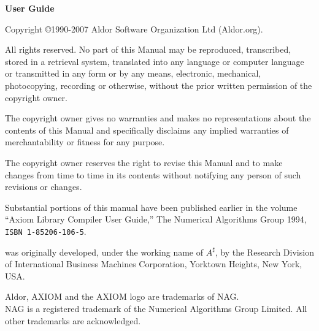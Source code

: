 \thispagestyle{empty}
{\bf \asharpName{} User Guide}


Copyright \copyright 1990-2007 Aldor Software Organization Ltd (Aldor.org).

\begin{small}
All rights reserved.  No part of this Manual may be reproduced, 
transcribed, stored in a retrieval system, translated into any language 
or computer language or transmitted in any form or by any means, 
electronic, mechanical, photocopying, recording or otherwise, without 
the prior written permission of the copyright owner.

The copyright owner gives no warranties and makes no representations 
about the contents of this Manual and specifically disclaims any implied
warranties of merchantability or fitness for any purpose.

The copyright owner reserves the right to revise this Manual and to make
changes from time to time in its contents without notifying any person 
of such revisions or changes.

\end{small}


Substantial portions of this manual have been published earlier
in the volume ``Axiom Library Compiler User Guide,'' 
The Numerical Algorithms Group 1994, {\tt ISBN 1-85206-106-5}.

\begin{small}
\asharpName{} was originally developed, under the working name
of $A^\sharp$, by the Research Division of
International Business Machines Corporation,
Yorktown Heights, New York, USA.

Aldor, AXIOM and the AXIOM logo are trademarks of NAG.
\\
NAG is a registered trademark of the Numerical Algorithms Group Limited.
All other trademarks are acknowledged.
\end{small}
\vspace{\baselineskip}

\clearpage

